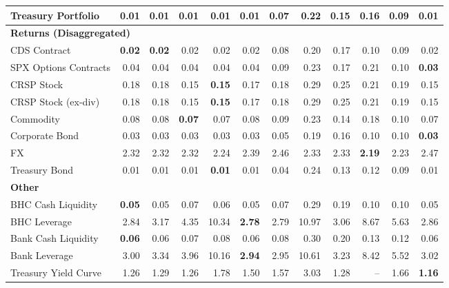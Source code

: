 \begin{table}[htbp]
\begin{tabular}{@{}lrrrrrrrrrrr@{}}
Treasury Portfolio & 0.01 & 0.01 & 0.01 & \textbf{0.01} & 0.01 & 0.07 & 0.22 & 0.15 & 0.16 & 0.09 & 0.01 \\
\midrule
\multicolumn{12}{l}{\textbf{Returns (Disaggregated)}} \\
CDS Contract & \textbf{0.02} & \textbf{0.02} & 0.02 & 0.02 & 0.02 & 0.08 & 0.20 & 0.17 & 0.10 & 0.09 & 0.02 \\
SPX Options Contracts & 0.04 & 0.04 & 0.04 & 0.04 & 0.04 & 0.09 & 0.23 & 0.17 & 0.21 & 0.10 & \textbf{0.03} \\
CRSP Stock & 0.18 & 0.18 & 0.15 & \textbf{0.15} & 0.17 & 0.18 & 0.29 & 0.25 & 0.21 & 0.19 & 0.15 \\
CRSP Stock (ex-div) & 0.18 & 0.18 & 0.15 & \textbf{0.15} & 0.17 & 0.18 & 0.29 & 0.25 & 0.21 & 0.19 & 0.15 \\
Commodity & 0.08 & 0.08 & \textbf{0.07} & 0.07 & 0.08 & 0.09 & 0.23 & 0.14 & 0.18 & 0.10 & 0.07 \\
Corporate Bond & 0.03 & 0.03 & 0.03 & 0.03 & 0.03 & 0.05 & 0.19 & 0.16 & 0.10 & 0.10 & \textbf{0.03} \\
FX & 2.32 & 2.32 & 2.32 & 2.24 & 2.39 & 2.46 & 2.33 & 2.33 & \textbf{2.19} & 2.23 & 2.47 \\
Treasury Bond & 0.01 & 0.01 & 0.01 & \textbf{0.01} & 0.01 & 0.04 & 0.24 & 0.13 & 0.12 & 0.09 & 0.01 \\
\midrule
\multicolumn{12}{l}{\textbf{Other}} \\
BHC Cash Liquidity & \textbf{0.05} & 0.05 & 0.07 & 0.06 & 0.05 & 0.07 & 0.29 & 0.19 & 0.10 & 0.10 & 0.05 \\
BHC Leverage & 2.84 & 3.17 & 4.35 & 10.34 & \textbf{2.78} & 2.79 & 10.97 & 3.06 & 8.67 & 5.63 & 2.86 \\
Bank Cash Liquidity & \textbf{0.06} & 0.06 & 0.07 & 0.08 & 0.06 & 0.08 & 0.30 & 0.20 & 0.13 & 0.12 & 0.06 \\
Bank Leverage & 3.00 & 3.34 & 3.96 & 10.16 & \textbf{2.94} & 2.95 & 10.61 & 3.23 & 8.42 & 5.52 & 3.02 \\
Treasury Yield Curve & 1.26 & 1.29 & 1.26 & 1.78 & 1.50 & 1.57 & 3.03 & 1.28 & -- & 1.66 & \textbf{1.16} \\
\bottomrule
\end{tabular}
\vspace{0.1cm}

\end{table}
